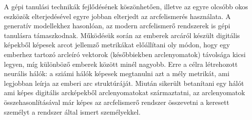 





A gépi tanulási technikák fejlődésének köszönhetően, illetve az egyre olcsóbb okos eszközök elterjedésével egyre jobban elterjedt az arcfelismerés használata. A generatív modellekhez hasonlóan, az modern arcfelismerő rendszerek is gépi tanulásra támaszkodnak. Működésük során az emberek arcáról készült digitális képekből képesek arcot jellemző metrikákat előállítani oly módon, hogy egy emberhez tartozó arcleíró vektorok (későbbiekben arclenyomatok) távolsága kicsi legyen, míg különböző emberek között minél nagyobb. Erre a célra létrehozott neurális hálók: a sziámi hálók képesek megtanulni azt a mély metrikát, ami legjobban leírja az emberi arc struktúráját. Miután sikerült betanítani egy hálót ami képes digitális arcképekből arclenyomatokat származtatni, az arclenyomatok összehasonlításával már képes az arcfelismerő rendszer összevetni a keresett személyt a rendszer által ismert személyekkel.

